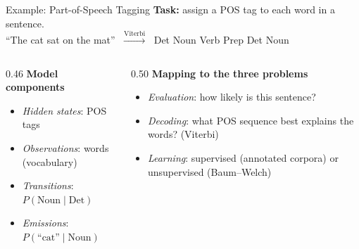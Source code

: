 \documentclass[aspectratio=169,t]{beamer}
\begin{document}
\begin{frame}{Example: Part-of-Speech Tagging}
  \textbf{Task:} assign a POS tag to each word in a sentence.\\[0.15cm]
  \quad``The \; cat \; sat \; on \; the \; mat''
  $\;\xrightarrow{\text{Viterbi}}\;$
  Det \; Noun \; Verb \; Prep \; Det \; Noun\\[0.25cm]
  \begin{columns}[T]
    \begin{column}{0.46\textwidth}
      \textbf{Model components}
      \begin{itemize}
        \item \emph{Hidden states}: POS tags
        \item \emph{Observations}: words (vocabulary)
        \item \emph{Transitions}: $P(\text{Noun}\mid\text{Det})$
        \item \emph{Emissions}: $P(\text{``cat''}\mid\text{Noun})$
      \end{itemize}
    \end{column}
    \begin{column}{0.50\textwidth}
      \textbf{Mapping to the three problems}
      \begin{itemize}
        \item \emph{Evaluation}: how likely is this sentence?
        \item \emph{Decoding}: what POS sequence best explains the words? (Viterbi)
        \item \emph{Learning}: supervised (annotated corpora) or unsupervised (Baum--Welch)
      \end{itemize}
    \end{column}
  \end{columns}
\end{frame}
\end{document}
